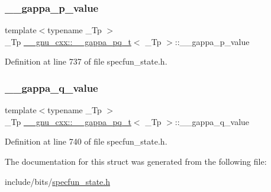 \subsubsection{\texorpdfstring{\+\_\+\+\_\+gappa\+\_\+p\+\_\+value}{\_\_gappa\_p\_value}}
{\footnotesize\ttfamily template$<$typename \+\_\+\+Tp $>$ \\
\+\_\+\+Tp \hyperlink{struct____gnu__cxx_1_1____gappa__pq__t}{\+\_\+\+\_\+gnu\+\_\+cxx\+::\+\_\+\+\_\+gappa\+\_\+pq\+\_\+t}$<$ \+\_\+\+Tp $>$\+::\+\_\+\+\_\+gappa\+\_\+p\+\_\+value}



Definition at line 737 of file specfun\+\_\+state.\+h.

\mbox{\label{struct____gnu__cxx_1_1____gappa__pq__t_afd7d83a4e618ca4b710c952638951714}} 
\subsubsection{\texorpdfstring{\+\_\+\+\_\+gappa\+\_\+q\+\_\+value}{\_\_gappa\_q\_value}}
{\footnotesize\ttfamily template$<$typename \+\_\+\+Tp $>$ \\
\+\_\+\+Tp \hyperlink{struct____gnu__cxx_1_1____gappa__pq__t}{\+\_\+\+\_\+gnu\+\_\+cxx\+::\+\_\+\+\_\+gappa\+\_\+pq\+\_\+t}$<$ \+\_\+\+Tp $>$\+::\+\_\+\+\_\+gappa\+\_\+q\+\_\+value}



Definition at line 740 of file specfun\+\_\+state.\+h.



The documentation for this struct was generated from the following file\+:\begin{DoxyCompactItemize}
\item 
include/bits/\hyperlink{specfun__state_8h}{specfun\+\_\+state.\+h}\end{DoxyCompactItemize}
